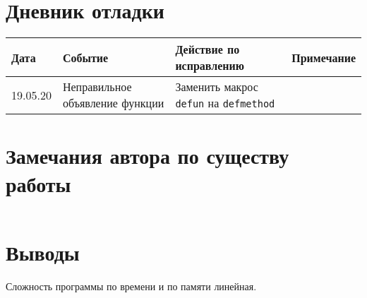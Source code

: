 \documentclass[12pt]{article}
\begin{document}
\section{Дневник отладки}
\begin{tabular}{| l | m{3cm} | l | l |}
\hline
Дата & Событие & Действие по исправлению & Примечание \\
\hline
19.05.20 & Неправильное объявление функции & Заменить макрос {\tt defun} на {\tt defmethod} & \\
\hline
\end{tabular}

\section{Замечания автора по существу работы}

\begin{lstlisting}[language=lisp]

\end{lstlisting}

\section{Выводы}
Сложность программы по времени и по памяти линейная.
\end{document}
